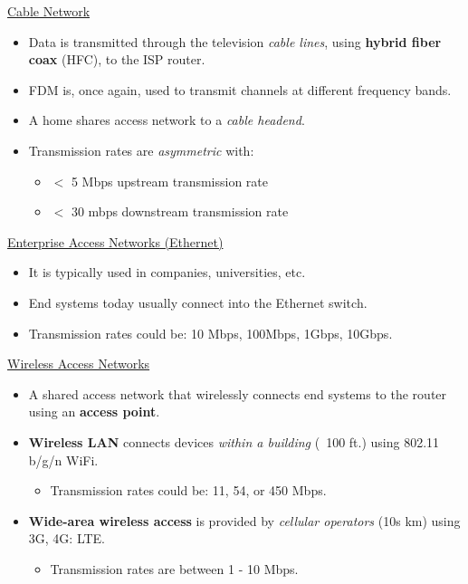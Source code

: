 \documentclass{article}
\begin{document}
\underline{Cable Network}

\begin{itemize}
\item Data is transmitted through the television {\it cable lines}, using {\bf hybrid fiber coax} (HFC), to the ISP router.
\item FDM is, once again, used to transmit channels at different frequency bands.
\item A home shares access network to a {\it cable headend}.
\item Transmission rates are {\it asymmetric} with:
\begin{itemize}
\item $<$ 5 Mbps upstream transmission rate
\item $<$ 30 mbps downstream transmission rate
\end{itemize}
\end{itemize}

\newpage

\underline{Enterprise Access Networks (Ethernet)}

\begin{itemize}
\item It is typically used in companies, universities, etc.
\item End systems today usually connect into the Ethernet switch.
\item Transmission rates could be: 10 Mbps, 100Mbps, 1Gbps, 10Gbps.
\end{itemize}

\underline{Wireless Access Networks}

\begin{itemize}
\item A shared access network that wirelessly connects end systems to the router using an {\bf access point}.
\item {\bf Wireless LAN} connects devices {\it within a building} (~100 ft.) using 802.11 b/g/n WiFi.
\begin{itemize}
\item Transmission rates could be: 11, 54, or 450 Mbps.
\end{itemize}
\item {\bf Wide-area wireless access} is provided by {\it cellular operators} (10s km) using 3G, 4G: LTE.
\begin{itemize}
\item Transmission rates are between 1 - 10 Mbps.
\end{itemize}
\end{itemize}
\end{document}
